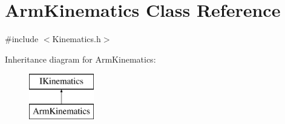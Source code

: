 \hypertarget{classArmKinematics}{\section{Arm\-Kinematics Class Reference}
\label{classArmKinematics}
}


{\ttfamily \#include $<$Kinematics.\-h$>$}

Inheritance diagram for Arm\-Kinematics\-:\begin{figure}[H]
\begin{center}
\leavevmode
\includegraphics[height=2.000000cm]{classArmKinematics}
\end{center}
\end{figure}
